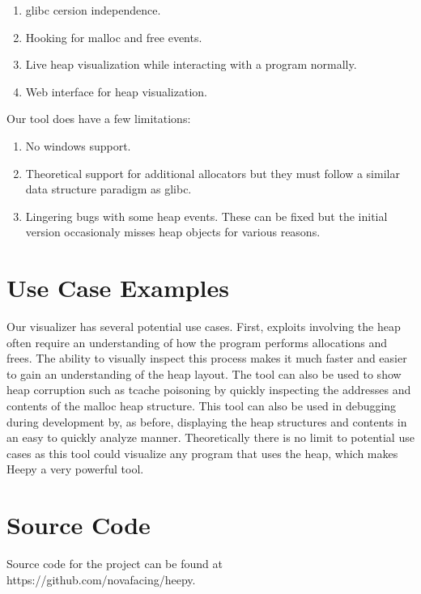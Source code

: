 \documentclass[12pt]{article}
\begin{document}
\begin{enumerate}
    \item glibc cersion independence.
    \item Hooking for malloc and free events.
    \item Live heap visualization while interacting with a program normally.
    \item Web interface for heap visualization.
\end{enumerate}

Our tool does have a few limitations: \\

\begin{enumerate}
    \item No windows support.
    \item Theoretical support for additional allocators but they must follow a similar data structure paradigm as glibc.
    \item Lingering bugs with some heap events. These can be fixed but the initial version occasionaly misses heap objects for various reasons.
\end{enumerate}

\section{Use Case Examples}

Our visualizer has several potential use cases. First, exploits involving the heap often require an understanding of how the program performs allocations and frees. The ability to visually inspect this process makes it much faster and easier to gain an understanding of the heap layout. The tool can also be used to show heap corruption such as tcache poisoning by quickly inspecting the addresses and contents of the malloc heap structure. This tool can also be used in debugging during development by, as before, displaying the heap structures and contents in an easy to quickly analyze manner. Theoretically there is no limit to potential use cases as this tool could visualize any program that uses the heap, which makes Heepy a very powerful tool. \\

\section{Source Code}

Source code for the project can be found at https://github.com/novafacing/heepy.
\end{document}
